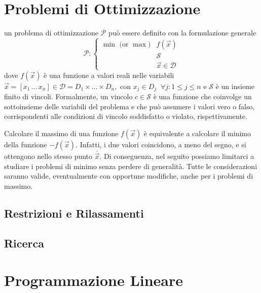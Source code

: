 \section{Problemi di Ottimizzazione}

un problema di ottimizzazione \( \mathcal{P} \) può essere definito con la formulazione generale
\begin{equation}\label{eq:opt_prob}
    \mathcal{P}\colon
    \begin{cases}
        \text{$\min$ (or $\max$)} & f(\vec{x}) \\
                                  & \mathcal{S} \\
                                  & \vec{x} \in \mathcal{D}
    \end{cases}
\end{equation}
dove
\(
    f(\vec{x})
\)
è una funzione a valori reali nelle variabili
\(
    \vec{x} = [x_1 \, \ldots \, x_n] \in \mathcal{D} = D_1 \times \dots \times D_n,
\)
con
\(
    x_j \in D_j \;\; \forall j \colon 1 \leq j \leq n
\)
e
\(
    \mathcal{S}
\)
è un insieme finito di vincoli. Formalmente, un vincolo
\(
    c \in \mathcal{S}
\)
è una funzione che coinvolge un sottoinsieme delle variabili del problema e che può assumere i valori vero o falso,
corrispondenti alle condizioni di vincolo soddisfatto o violato, rispettivamente.

Calcolare il massimo di una funzione
\(
    f(\vec{x})
\)
è equivalente a calcolare il minimo della funzione
\(
    -f(\vec{x})
\). Infatti, i due valori coincidono, a meno del segno, e si ottengono nello stesso punto
\(
    \bar{\vec{x}}
\).
Di conseguenza, nel seguito possiamo limitarci a studiare i problemi di minimo senza perdere di generalità. Tutte le
considerazioni saranno valide, eventualmente con opportune modifiche, anche per i problemi di massimo.

\subsection{Restrizioni e Rilassamenti}

\subsection{Ricerca}

\section{Programmazione Lineare}

